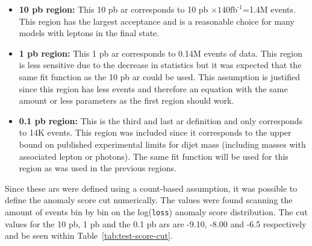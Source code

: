 \begin{itemize}
    \item \textbf{10 pb region:} This 10 pb \gls{ar} corresponds to 10 pb $\times \textrm{140} \textrm{fb}^{\textrm{-1}}$=1.4M events. This region has the largest acceptance 
    and is a reasonable choice for many models with leptons in the final state.
    \item \textbf{1 pb region:} This 1 pb \gls{ar} corresponds to 0.14M events of data. This region is less sensitive due to the decrease in statistics but it was expected  
    that the same fit function as the 10 pb \gls{ar} could be used. This assumption is justified since this region has less events and therefore an equation with the same 
    amount or less parameters as the first region should work.
    \item \textbf{0.1 pb region:} This is the third and last \gls{ar} definition and only corresponds to 14K events. This region was included since it corresponds to the upper 
    bound on published experimental limits for dijet mass (including masses with associated lepton or photons). The same fit function will be used for this region as was 
    used in the previous regions.
\end{itemize}    

Since these \gls{ar}s were defined using a count-based assumption, it was possible to define the anomaly score cut numerically. The values were found scanning the 
amount of events bin by bin on the log(\texttt{loss}) anomaly score distribution. The cut values for the 10 pb, 1 pb and the 0.1 pb \gls{ar}s are -9.10, -8.00 and -6.5 respectively and be seen within Table~\ref{tab:test-score-cut}.

\newpage

